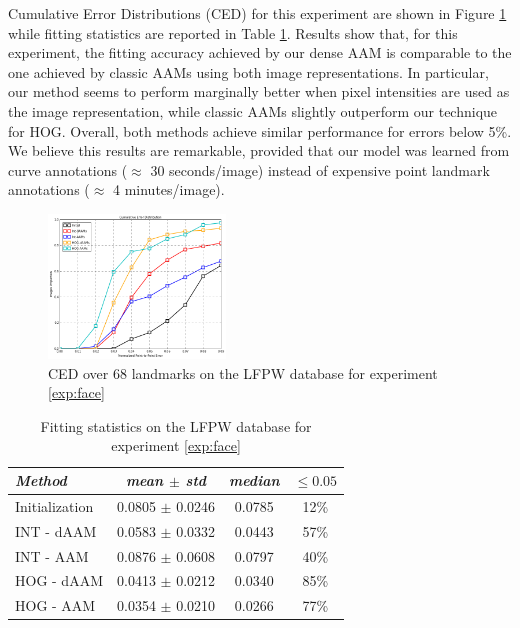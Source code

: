 Cumulative Error Distributions (CED) for this experiment are shown in Figure \ref{fig:face_ced} while fitting statistics are reported in Table \ref{tab:face_stats}. Results show that, for this experiment, the fitting accuracy achieved by our dense AAM is comparable to the one achieved by classic AAMs using both image representations. In particular, our method seems to perform marginally better when pixel intensities are used as the image representation, while classic AAMs slightly outperform our technique for HOG. Overall, both methods achieve similar performance for errors below 5\%. We believe this results are remarkable, provided that our model was learned from curve annotations ($\approx$ 30 seconds/image) instead of expensive point landmark annotations ($\approx$ 4 minutes/image).

\begin{figure}[t!]
\centering
\includegraphics[width=0.42\textwidth]{resources/Fig_Alignment/face_ced}
\caption{CED over 68 landmarks on the LFPW database for experiment \ref{exp:face}}
\label{fig:face_ced}
\end{figure}

\begin{table}[t]
\small
\centering
\begin{tabular}{|l|c|c|c|}
\hline
\emph{Method}   & \emph{mean $\pm$ std} & \emph{median} & $\leq 0.05$\\
\hline\hline
Initialization  & 0.0805 $\pm$ 0.0246 & 0.0785 & 12\%\\
INT - dAAM      & 0.0583 $\pm$ 0.0332 & 0.0443 & 57\%\\
INT - AAM       & 0.0876 $\pm$ 0.0608 & 0.0797 & 40\%\\
HOG - dAAM      & 0.0413 $\pm$ 0.0212 & 0.0340 & 85\%\\
HOG - AAM       & 0.0354 $\pm$ 0.0210 & 0.0266 & 77\%\\
\hline
\end{tabular}
\caption{Fitting statistics on the LFPW database for experiment \ref{exp:face}}
\label{tab:face_stats}
\end{table}

